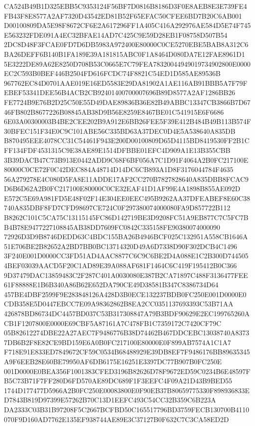 \documentclass[UTF8,fontset=fandol,zihao=-4,a4paper]{ctexart}
\begin{document}
{{CA524B49B1D325EBB5C9353124F56BF7D0816B8186D3F0E8AEB8E3E739FE4FB43F8E8577A2AF7320D43542ED81B52F65EFAC50CFEE6BD7B20C6AB001
D00100809DA5E98F8672CF6E2A617296FF1A405C416A292976AE584D5E74F745E563232FDE091A4EC32BFAE14AD7C425C9E59D28EB1F08758D507B54
2DC8D48F3FCAE0FD7D6DB5983A972400E80000C0CE5270EBE5BAB8A312C6BA26DEFF6B140B1FA189E39A181815ABC0F1A8464D080DA7E12FAE8961D1
5E3222DE89A62E8250D708B53C0665E7C79FEA78320044949019734902800E0000EC2C593B0BEF446B2504FD616FCDC74F8821C54ED1D585AE89536B
967762EC84D0701AAE019E16ED5583E29DA81902A1AE116AB91BBB5A7F79FEBEF53341DEE56B4ACB2CB92401400700007696B89D8577A2AF1286BB26
FE7724B9E76B2D25C50E55D49DAE89836B36E82B49ABBC13347CB3866B7D6746FB802B8677226B08845AB38D9B56E8259E8467BE01C541915E6F6686
6E03A00300003B4BE2CEE202B9A912E6BB26FEE5F39E412B484B49B113B574F30BFEC151F34E0C9C101ABE56C335BD63A37DEC0D4E5A538640A835DB
B870495EEE4078CC31C54461F943E200D00100809D65D4115BD8419530FF2B1CFF134FDF4531315C9E38AE89E1514DFBBE01EFC4D909A1E13B355CBB
3B39DACB47C73B913E0442ADD9C68F6BF056A7C1D91F4064A2B0FC217100E80000C0CE72F0C42DEC884A48714D14DC6CB893A1D8F3176044784F4635
56A279278E4C080D5FA8E11ADDE17AF2CC270B7827828640A835DBB8FCAC9D6B6D62A2B0FC217100E80000C0CE32EAF41D1AF99E4A1898B855AE092D
E572C5E69A981FD5E48F02F14E304EE0EEC495B9262AA37DFEABEF8E60C38740A835DBF8FD7CFD98697CE724C0F297380074000080FA9D857722B112
B8262C101C5CA75C13115145FC86D142719BE3D9208FC51A9EB877C7C5FC7BB4B78E9477227108845AB38DD7609FC0842C335158FE90380074000090
72926D3D9B8746DEDD63C4BDC155BA26B4946BCF025C132951A558CB1646A51E706BE2B82652A2BD7BB0BC13714320D49A6D7338D90F302DCB4C1496
3F240E001D0000CC3FD51AD4AAC8877C6C9C6BE2D4A088E1C2B300D7445054BEF03039AACD5F20C1AD89E39A088AF681F1464C6C419F195412B0C366
9D37479DAC13859483C2F287C401A0030080E387B2CA71897C488F3136477FEE61F88888E1B6B340A86B62E652DA790CE49D38581B347C8386734D64
457BE4DBF2599F9E283848126A428D3B0ECE132237BDB0FC250E001D0000E0CDB358E5D0447EBCC7E09A98362862B8EA2CC0351137693393C53B71AA
426878BD86734DC4457BD037C53B317308847A79B3BDF90629E2EC199765260ACB1F1207800E0000E69CBF5A87161A7C478FB1C7359172C7420CF79C
05B82612274DBE22A27AEC7F9486776B38D74462B467DDCEBC13038740A83737DB6B2F8E82CE9BD159E6A0B0FC217100E80000E0F899AB7574A1C1A7
F718E91E833ED7849672CF59C0534B68488929E39DB8EF7F9486176BB89635345A9F6EEB28E60BE79950AF6DB6175E16251E3397DC77B907B0FC250E
001D0000E0BEA356F1001383CFED3196B82626D78F9672ED59C0234B6E48597FB5C73B71F7FF280D6FD570AE89DC689F1F3EEFC4F09A21D43B9BED55
1744D177477D5966A2B0FC250E00083800E0F90EB37B80659775330F898936833ED7843B819D97399E57262B70C13D1EEFC493C54CC32B359C6B223A
DA2333C03B31B97208F5C2667BCFBD50C165517796BD3759FECB130700B4110070F9D160AD7762E135EF938744AE89E3C37127B0F632C7C3CA58ED2D
}}
\end{document}
